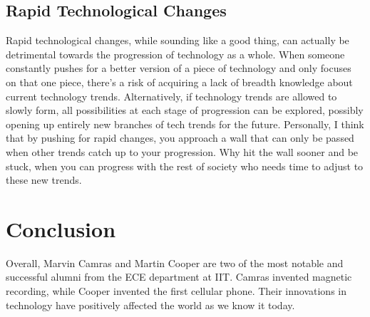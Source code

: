 \documentclass[12pt,letter]{article}
\begin{document}
\subsection{Rapid Technological Changes}
Rapid technological changes, while sounding like a good thing, can actually be detrimental towards the progression of technology as a whole. When someone constantly pushes for a better version of a piece of technology and only focuses on that one piece, there's a risk of acquiring a lack of breadth knowledge about current technology trends. Alternatively, if technology trends are allowed to slowly form, all possibilities at each stage of progression can be explored, possibly opening up entirely new branches of tech trends for the future. Personally, I think that by pushing for rapid changes, you approach a wall that can only be passed when other trends catch up to your progression. Why hit the wall sooner and be stuck, when you can progress with the rest of society who needs time to adjust to these new trends.
\section{Conclusion}
Overall, Marvin Camras and Martin Cooper are two of the most notable and successful alumni from the ECE department at IIT. Camras invented magnetic recording, while Cooper invented the first cellular phone. Their innovations in technology have positively affected the world as we know it today.


\end{document}
